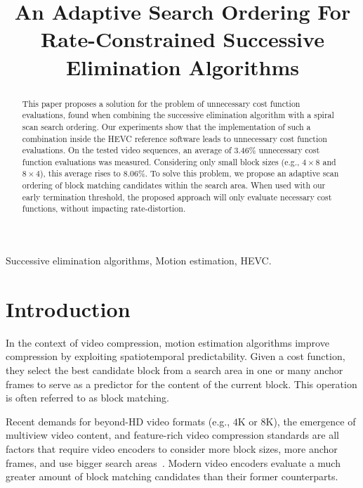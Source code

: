 \documentclass{article}
\title{An Adaptive Search Ordering For Rate-Constrained Successive Elimination Algorithms}
\begin{document}
\maketitle

\begin{abstract}
This paper proposes a solution for the problem of unnecessary cost function evaluations, found when combining the successive elimination algorithm with a spiral scan search ordering. Our experiments show that the implementation of such a combination inside the HEVC reference software leads to unnecessary cost function evaluations. On the tested video sequences, an average of 3.46\% unnecessary cost function evaluations was measured. Considering only small block sizes (e.g., $4\!\times\!8$ and $8\!\times\!4$), this average rises to 8.06\%. To solve this problem, we propose an adaptive scan ordering of block matching candidates within the search area. When used with our early termination threshold, the proposed approach will only evaluate necessary cost functions, without impacting rate-distortion.
\end{abstract}

\begin{keywords}
\small{Successive elimination algorithms, Motion estimation, HEVC.}
\end{keywords}

\vspace{-2mm}
\section{Introduction}
\label{sec:intro}
\vspace{-1mm}
In the context of video compression, motion estimation algorithms improve compression by exploiting spatiotemporal predictability. Given a cost function, they select the best candidate block from a search area in one or many anchor frames to serve as a predictor for the content of the current block. This operation is often referred to as block matching.

Recent demands for beyond-HD video formats (e.g., $4\text{K}$ or $8\text{K}$), the emergence of multiview video content, and feature-rich video compression standards are all factors that require video encoders to consider more block sizes, more anchor frames, and use bigger search areas~\cite{Sullivan2012}. Modern video encoders evaluate a much greater amount of block matching candidates than their former counterparts.  
\end{document}
